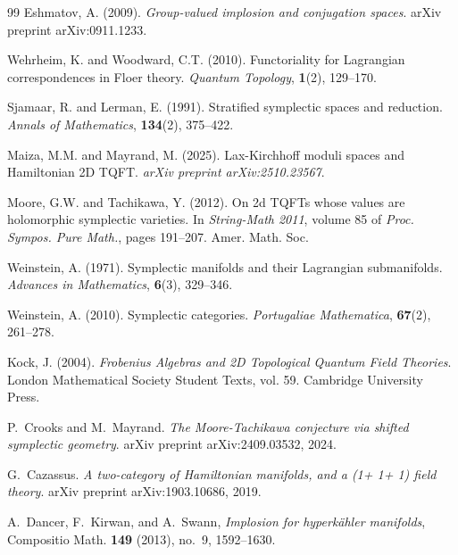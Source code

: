 \documentclass[reqno]{amsart}
\theoremstyle{plain}
\theoremstyle{definition}
\begin{document}
\begin{thebibliography}{99}
Eshmatov, A. (2009).
\textit{Group-valued implosion and conjugation spaces}. 
arXiv preprint arXiv:0911.1233.

Wehrheim, K. and Woodward, C.T. (2010).
Functoriality for Lagrangian correspondences in Floer theory. 
\textit{Quantum Topology}, \textbf{1}(2), 129--170.

Sjamaar, R. and Lerman, E. (1991).
Stratified symplectic spaces and reduction. 
\textit{Annals of Mathematics}, \textbf{134}(2), 375--422.

Maiza, M.M. and Mayrand, M. (2025).
Lax-Kirchhoff moduli spaces and Hamiltonian 2D TQFT. 
\textit{arXiv preprint arXiv:2510.23567}.

Moore, G.W. and Tachikawa, Y. (2012).
On 2d TQFTs whose values are holomorphic symplectic varieties.
In \textit{String-Math 2011}, volume 85 of \textit{Proc. Sympos. Pure Math.}, pages 191--207. Amer. Math. Soc.

Weinstein, A. (1971).
Symplectic manifolds and their Lagrangian submanifolds.
\textit{Advances in Mathematics}, \textbf{6}(3), 329--346.

Weinstein, A. (2010).
Symplectic categories.
\textit{Portugaliae Mathematica}, \textbf{67}(2), 261--278.

Kock, J. (2004).
\textit{Frobenius Algebras and 2D Topological Quantum Field Theories}.
London Mathematical Society Student Texts, vol. 59. Cambridge University Press.

P.~Crooks and M.~Mayrand.
\textit{The Moore-Tachikawa conjecture via shifted symplectic geometry}.
arXiv preprint arXiv:2409.03532, 2024.

G.~Cazassus.
\textit{A two-category of Hamiltonian manifolds, and a (1+ 1+ 1) field theory}.
arXiv preprint arXiv:1903.10686, 2019.

A.~Dancer, F.~Kirwan, and A.~Swann,
\textit{Implosion for hyperk\"ahler manifolds},
Compositio Math. \textbf{149} (2013), no.~9, 1592--1630.

\end{thebibliography}
\end{document}
